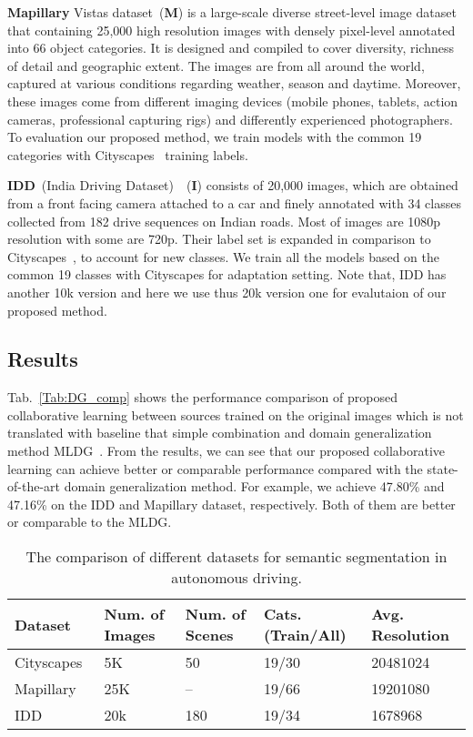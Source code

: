 \documentclass[final]{cvpr}
\begin{document}
\textbf{Mapillary} Vistas dataset~(\textbf{M}) is a large-scale diverse street-level image dataset that containing 25,000 high resolution images with densely pixel-level annotated into 66 object categories. It is designed and compiled to cover diversity, richness of detail and geographic extent. The images are from all around the world, captured at various conditions regarding weather, season and daytime. Moreover, these images come from different imaging devices (mobile phones, tablets, action cameras, professional capturing rigs) and differently experienced photographers. To evaluation our proposed method, we train models with the common 19 categories with Cityscapes~\cite{cordts2016cityscapes} training labels.

\textbf{IDD}~(India Driving Dataset)~\cite{varma2019idd}~(\textbf{I}) consists of 20,000 images, which are obtained from a front facing camera attached to a car and finely annotated with 34 classes collected from 182 drive sequences on Indian roads. Most of images are 1080p resolution with some are 720p. Their label set is expanded in comparison to Cityscapes~\cite{cordts2016cityscapes}, to account for new classes. We train all the models based on the common 19 classes with Cityscapes for adaptation setting. Note that, IDD has another 10k version and here we use thus 20k version one for evalutaion of our proposed method.



\subsection{Results}
Tab.~\ref{Tab:DG_comp} shows the performance comparison of proposed collaborative learning between sources trained on the original images which is not translated with baseline that simple combination and domain generalization method MLDG~\cite{zhang2020generalizable}. From the results, we can see that our proposed collaborative learning can achieve better or comparable performance compared with the state-of-the-art domain generalization method. For example, we achieve 47.80\% and 47.16\% on the IDD and Mapillary dataset, respectively. Both of them are better or comparable to the MLDG.
\begin{table}[t]
	\setlength{\tabcolsep}{0.66mm}
	\caption{The comparison of different datasets for semantic segmentation in autonomous driving.}
	\label{tab:data_comp}
	\begin{tabular}{l|p{1.2cm}<{\centering}p{1.32cm}<{\centering}p{1.4cm}<{\centering}p{1.9cm}<{\centering}}
		\hline
		Dataset & Num. of Images & Num. of Scenes & Cats. (Train/All) & Avg. Resolution \\
		\hline
		Cityscapes~\cite{cordts2016cityscapes} & 5K & 50 & 19/30 & 20481024\\
		Mapillary~\cite{MVD2017} & 25K & -- & 19/66 & 19201080\\
		IDD~\cite{varma2019idd} & 20k & 180 & 19/34 & 1678968\\
		\hline
	\end{tabular}
\end{table}
\end{document}
